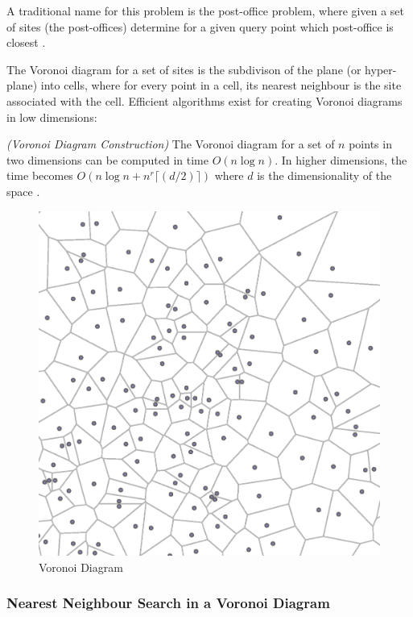 \documentclass[mcs]{scsthesis}
\begin{document}
A traditional name for this problem is the post-office problem, where given a
set of sites (the post-offices) determine for a given query point which
post-office is closest \cite{dutch}.

The Voronoi diagram for a set of sites is the subdivison of the plane (or
hyper-plane) into cells, where for every point in a cell, its nearest neighbour
is the site associated with the cell. Efficient algorithms exist for creating
Voronoi diagrams in low dimensions:

\begin{thm} \emph{(Voronoi Diagram Construction)}
The Voronoi diagram for a set of $n$ points in two dimensions can be computed
in time \(O(n \log n)\). In higher dimensions, the time becomes
\(O(n \log n + n^r{\lceil(d/2)\rceil})\) where $d$ is the dimensionality of the
space \cite{dutch}.
\end{thm}

\begin{figure}
\begin{center}
\includegraphics[scale=0.5]{diagrams/voronoi.eps}
\caption{Voronoi Diagram}
\label{fig:voronoi_diagram}
\end{center}
\end{figure}

\subsubsection{Nearest Neighbour Search in a Voronoi Diagram}
\end{document}
